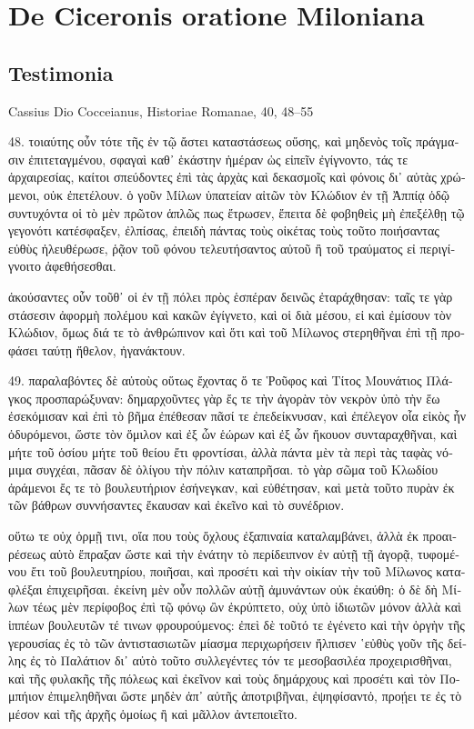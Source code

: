 \section*{De Ciceronis oratione Miloniana}

\subsection*{Testimonia}

Cassius Dio Cocceianus, Historiae Romanae, 40, 48–55

\bigskip


\begin{greek}

48. τοιαύτης οὖν τότε τῆς ἐν τῷ ἄστει καταστάσεως οὔσης, καὶ μηδενὸς τοῖς πράγμασιν ἐπιτεταγμένου, σφαγαὶ καθ᾽ ἑκάστην ἡμέραν ὡς εἰπεῖν ἐγίγνοντο, τάς τε ἀρχαιρεσίας, καίτοι σπεύδοντες ἐπὶ τὰς ἀρχὰς καὶ δεκασμοῖς καὶ φόνοις δι᾽ αὐτὰς χρώμενοι, οὐκ ἐπετέλουν. ὁ γοῦν Μίλων ὑπατείαν αἰτῶν τὸν Κλώδιον ἐν τῇ Ἀππίᾳ ὁδῷ συντυχόντα οἱ τὸ μὲν πρῶτον ἁπλῶς πως ἔτρωσεν, ἔπειτα δὲ φοβηθεὶς μὴ ἐπεξέλθῃ τῷ γεγονότι κατέσφαξεν, ἐλπίσας, ἐπειδὴ πάντας τοὺς οἰκέτας τοὺς τοῦτο ποιήσαντας εὐθὺς ἠλευθέρωσε, ῥᾷον τοῦ φόνου τελευτήσαντος αὐτοῦ ἢ τοῦ τραύματος εἰ περιγίγνοιτο ἀφεθήσεσθαι. 

ἀκούσαντες οὖν τοῦθ᾽ οἱ ἐν τῇ πόλει πρὸς ἑσπέραν δεινῶς ἐταράχθησαν: ταῖς τε γὰρ στάσεσιν ἀφορμὴ πολέμου καὶ κακῶν ἐγίγνετο, καὶ οἱ διὰ μέσου, εἰ καὶ ἐμίσουν τὸν Κλώδιον, ὅμως διά τε τὸ ἀνθρώπινον καὶ ὅτι καὶ τοῦ Μίλωνος στερηθῆναι ἐπὶ τῇ προφάσει ταύτῃ ἤθελον, ἠγανάκτουν. 

49. παραλαβόντες δὲ αὐτοὺς οὕτως ἔχοντας ὅ τε Ῥοῦφος καὶ Τίτος Μουνάτιος Πλάγκος προσπαρώξυναν: δημαρχοῦντες γὰρ ἔς τε τὴν ἀγορὰν τὸν νεκρὸν ὑπὸ τὴν ἕω ἐσεκόμισαν καὶ ἐπὶ τὸ βῆμα ἐπέθεσαν πᾶσί τε ἐπεδείκνυσαν, καὶ ἐπέλεγον οἷα εἰκὸς ἦν ὀδυρόμενοι, ὥστε τὸν ὅμιλον καὶ ἐξ ὧν ἑώρων καὶ ἐξ ὧν ἤκουον συνταραχθῆναι, καὶ μήτε τοῦ ὁσίου μήτε τοῦ θείου ἔτι φροντίσαι, ἀλλὰ πάντα μὲν τὰ περὶ τὰς ταφὰς νόμιμα συγχέαι, πᾶσαν δὲ ὀλίγου τὴν πόλιν καταπρῆσαι. τὸ γὰρ σῶμα τοῦ Κλωδίου ἀράμενοι ἔς τε τὸ βουλευτήριον ἐσήνεγκαν, καὶ εὐθέτησαν, καὶ μετὰ τοῦτο πυρὰν ἐκ τῶν βάθρων συννήσαντες ἔκαυσαν καὶ ἐκεῖνο καὶ τὸ συνέδριον. 

οὕτω τε οὐχ ὁρμῇ τινι, οἵα που τοὺς ὄχλους ἐξαπιναία καταλαμβάνει, ἀλλὰ ἐκ προαιρέσεως αὐτὸ ἔπραξαν ὥστε καὶ τὴν ἐνάτην τὸ περίδειπνον ἐν αὐτῇ τῇ ἀγορᾷ, τυφομένου ἔτι τοῦ βουλευτηρίου, ποιῆσαι, καὶ προσέτι καὶ τὴν οἰκίαν τὴν τοῦ Μίλωνος καταφλέξαι ἐπιχειρῆσαι. ἐκείνη μὲν οὖν πολλῶν αὐτῇ ἀμυνάντων οὐκ ἐκαύθη: ὁ δὲ δὴ Μίλων τέως μὲν περίφοβος ἐπὶ τῷ φόνῳ ὢν ἐκρύπτετο, οὐχ ὑπὸ ἰδιωτῶν μόνον ἀλλὰ καὶ ἱππέων βουλευτῶν τέ τινων φρουρούμενος: ἐπεὶ δὲ τοῦτό τε ἐγένετο καὶ τὴν ὀργὴν τῆς γερουσίας ἐς τὸ τῶν ἀντιστασιωτῶν μίασμα περιχωρήσειν ἤλπισεν ῾εὐθὺς γοῦν τῆς δείλης ἐς τὸ Παλάτιον δι᾽ αὐτὸ τοῦτο συλλεγέντες τόν τε μεσοβασιλέα προχειρισθῆναι, καὶ τῆς φυλακῆς τῆς πόλεως καὶ ἐκεῖνον καὶ τοὺς δημάρχους καὶ προσέτι καὶ τὸν Πομπήιον ἐπιμεληθῆναι ὥστε μηδὲν ἀπ᾽ αὐτῆς ἀποτριβῆναι, ἐψηφίσαντὀ, προῄει τε ἐς τὸ μέσον καὶ τῆς ἀρχῆς ὁμοίως ἢ καὶ μᾶλλον ἀντεποιεῖτο.


\end{greek}
